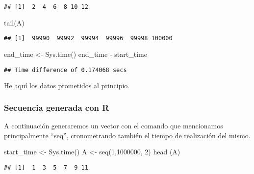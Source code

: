 \documentclass[]{elsarticle} %
\newenvironment{Shaded}{\begin{snugshade}}{\end{snugshade}}
\newcommand{\DecValTok}[1]{\textcolor[rgb]{0.00,0.00,0.81}{#1}}
\newcommand{\FunctionTok}[1]{\textcolor[rgb]{0.00,0.00,0.00}{#1}}
\newcommand{\NormalTok}[1]{#1}
\newcommand{\OtherTok}[1]{\textcolor[rgb]{0.56,0.35,0.01}{#1}}
\newcommand{\SpecialCharTok}[1]{\textcolor[rgb]{0.00,0.00,0.00}{#1}}
\begin{document}
\begin{verbatim}
## [1]  2  4  6  8 10 12
\end{verbatim}

\begin{Shaded}
\begin{Highlighting}[]
\FunctionTok{tail}\NormalTok{(A)}
\end{Highlighting}
\end{Shaded}

\begin{verbatim}
## [1]  99990  99992  99994  99996  99998 100000
\end{verbatim}

\begin{Shaded}
\begin{Highlighting}[]
\NormalTok{end\_time }\OtherTok{\textless{}{-}} \FunctionTok{Sys.time}\NormalTok{()}
\NormalTok{end\_time }\SpecialCharTok{{-}}\NormalTok{ start\_time}
\end{Highlighting}
\end{Shaded}

\begin{verbatim}
## Time difference of 0.174068 secs
\end{verbatim}

He aquí los datos prometidos al principio.

\hypertarget{secuencia-generada-con-r}{%
\subsubsection{Secuencia generada con
R}\label{secuencia-generada-con-r}}

A continuación generaremos un vector con el comando que mencionamos
principalmente ``seq'', cronometrando también el tiempo de realización
del mismo.

\begin{Shaded}
\begin{Highlighting}[]
\NormalTok{start\_time }\OtherTok{\textless{}{-}} \FunctionTok{Sys.time}\NormalTok{()}
\NormalTok{A }\OtherTok{\textless{}{-}} \FunctionTok{seq}\NormalTok{(}\DecValTok{1}\NormalTok{,}\DecValTok{1000000}\NormalTok{, }\DecValTok{2}\NormalTok{)}
\FunctionTok{head}\NormalTok{ (A)}
\end{Highlighting}
\end{Shaded}

\begin{verbatim}
## [1]  1  3  5  7  9 11
\end{verbatim}
\end{document}
